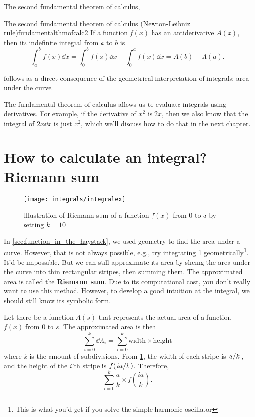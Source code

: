 The second fundamental theorem of calculus,
\begin{thm}{The second fundamental theorem of calculus (Newton-Leibniz rule)}{fundamentalthmofcalc2}
    If a function $f(x)$ has an antiderivative $A(x)$, then its indefinite integral from $a$ to $b$ is
    \begin{equation}
        \int_{a}^{b}f(x)\dd{x} = \int_{0}^{b}f(x)\dd{x} - \int_{0}^{a}f(x)\dd{x} = A(b) - A(a).
    \end{equation}
\end{thm}
follows as a direct consequence of the geometrical interpretation of integrals: area under the curve.

The fundamental theorem of calculus allows us to evaluate integrals using derivatives. For example, if the derivative of $x^2$ is $2x$, then we also know that the integral of $2x\dd{x}$ is just $x^2$, which we'll discuss how to do that in the next chapter.

\section{How to calculate an integral? Riemann sum}
\label{sec:riemann_sum}

\begin{figure}[b]
    \centering
    \texttt{[image: integrals/integralex]}
    \caption{Illustration of Riemann sum of a function $f(x)$ from $0$ to $a$ by setting $k = 10$}
    \label{fig:integralex1}
\end{figure}

In \cref{sec:function_in_the_haystack}, we used geometry to find the area under a curve. However, that is not always possible, e.g., try integrating \cref{fig:integralex1} geometrically\footnote{This is what you'd get if you solve the simple harmonic oscillator}. It'd be impossible. But we can still approximate its area by slicing the area under the curve into thin rectangular stripes, then summing them. The approximated area is called the \textbf{Riemann sum}. Due to its computational cost, you don't really want to use this method. However, to develop a good intuition at the integral, we should still know its symbolic form.

Let there be a function $A(s)$ that represents the actual area of a function $f(x)$ from $0$ to $s$. The approximated area is then
\begin{equation}
    \sum_{i = 0}^{k}\dd{A_i} = \sum_{i = 0}^{k}\mathrm{width} \times \mathrm{height}
\end{equation}
where $k$ is the amount of subdivisions. From \cref{fig:integralex1}, the width of each stripe is $\flatfrac{a}{k}$, and the height of the $i$'th stripe is $f(\flatfrac{ia}{k})$. Therefore,
\begin{equation*}
    \sum_{i = 0}^{k}\frac{a}{k}\times f\left(\frac{ia}{k}\right).
\end{equation*}

